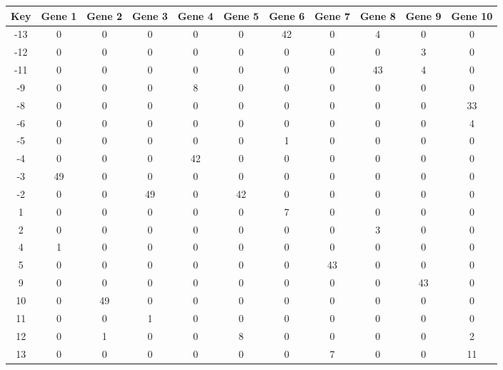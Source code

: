 \begin{tabular}{|c|c|c|c|c|c|c|c|c|c|c|}
\hline
Key & Gene 1 & Gene 2 & Gene 3 & Gene 4 & Gene 5 & Gene 6 & Gene 7 & Gene 8 & Gene 9 & Gene 10 \\
\hline
-13 & 0 & 0 & 0 & 0 & 0 & 42 & 0 & 4 & 0 & 0 \\
-12 & 0 & 0 & 0 & 0 & 0 & 0 & 0 & 0 & 3 & 0 \\
-11 & 0 & 0 & 0 & 0 & 0 & 0 & 0 & 43 & 4 & 0 \\
-9 & 0 & 0 & 0 & 8 & 0 & 0 & 0 & 0 & 0 & 0 \\
-8 & 0 & 0 & 0 & 0 & 0 & 0 & 0 & 0 & 0 & 33 \\
-6 & 0 & 0 & 0 & 0 & 0 & 0 & 0 & 0 & 0 & 4 \\
-5 & 0 & 0 & 0 & 0 & 0 & 1 & 0 & 0 & 0 & 0 \\
-4 & 0 & 0 & 0 & 42 & 0 & 0 & 0 & 0 & 0 & 0 \\
-3 & 49 & 0 & 0 & 0 & 0 & 0 & 0 & 0 & 0 & 0 \\
-2 & 0 & 0 & 49 & 0 & 42 & 0 & 0 & 0 & 0 & 0 \\
1 & 0 & 0 & 0 & 0 & 0 & 7 & 0 & 0 & 0 & 0 \\
2 & 0 & 0 & 0 & 0 & 0 & 0 & 0 & 3 & 0 & 0 \\
4 & 1 & 0 & 0 & 0 & 0 & 0 & 0 & 0 & 0 & 0 \\
5 & 0 & 0 & 0 & 0 & 0 & 0 & 43 & 0 & 0 & 0 \\
9 & 0 & 0 & 0 & 0 & 0 & 0 & 0 & 0 & 43 & 0 \\
10 & 0 & 49 & 0 & 0 & 0 & 0 & 0 & 0 & 0 & 0 \\
11 & 0 & 0 & 1 & 0 & 0 & 0 & 0 & 0 & 0 & 0 \\
12 & 0 & 1 & 0 & 0 & 8 & 0 & 0 & 0 & 0 & 2 \\
13 & 0 & 0 & 0 & 0 & 0 & 0 & 7 & 0 & 0 & 11 \\
\hline
\end{tabular}